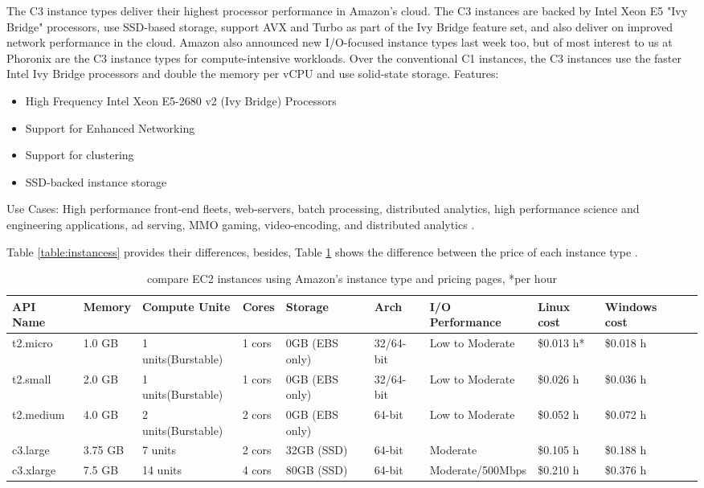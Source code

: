 \documentclass[10pt, conference]{IEEEtran}
\begin{document}
The C3 instance types deliver their highest processor performance in Amazon's cloud. The C3 instances are backed by Intel Xeon E5 "Ivy Bridge" processors, use SSD-based storage, support AVX and Turbo as part of the Ivy Bridge feature set, and also deliver on improved network performance in the cloud. Amazon also announced new I/O-focused instance types last week too, but of most interest to us at Phoronix are the C3 instance types for compute-intensive workloads. Over the conventional C1 instances, the C3 instances use the faster Intel Ivy Bridge processors and double the memory per vCPU and use solid-state storage. 
Features:
\begin{itemize}

\item High Frequency Intel Xeon E5-2680 v2 (Ivy Bridge) Processors
\item Support for Enhanced Networking
\item Support for clustering
\item SSD-backed instance storage

\end{itemize}
Use Cases: High performance front-end fleets, web-servers, batch processing, distributed analytics, high performance science and engineering applications, ad serving, MMO gaming, video-encoding, and distributed analytics \cite{ref1} \cite{ref2}. 


Table \ref{table:instancess} provides their differences, besides, Table \ref{table:price} shows the difference between the price of each instance type \cite{ref3} \cite{ref4}. 

\begin{table}
\begin{center}
\begin{tabular}{|l|l|l|l|l|l|l|l|l|l|}
  \hline
  API Name & Memory & Compute Unite & Cores & Storage & Arch & I/O Performance & Linux cost & Windows cost \\
  \hline
  t2.micro & 1.0 GB & 1 units(Burstable) & 1 cors & 0GB (EBS only) & 32/64-bit & Low to Moderate & \$0.013 h* & \$0.018 h\\
  t2.small & 2.0 GB & 1 units(Burstable) & 1 cors & 0GB (EBS only) & 32/64-bit & Low to Moderate & \$0.026 h & \$0.036 h\\
  t2.medium & 4.0 GB & 2 units(Burstable) & 2 cors & 0GB (EBS only) & 64-bit & Low to Moderate & \$0.052 h & \$0.072 h\\
  c3.large & 3.75 GB & 7 units & 2 cors & 32GB (SSD) & 64-bit & Moderate & \$0.105 h& \$0.188 h\\
  c3.xlarge & 7.5 GB & 14 units & 4 cors & 80GB (SSD) & 64-bit & Moderate/500Mbps & \$0.210 h & \$0.376 h\\
   \hline
\end{tabular}
\caption{\label{table:price} compare EC2 instances using Amazon's instance type and pricing pages, *per hour}
\end{center}
\end{table}
\end{document}

